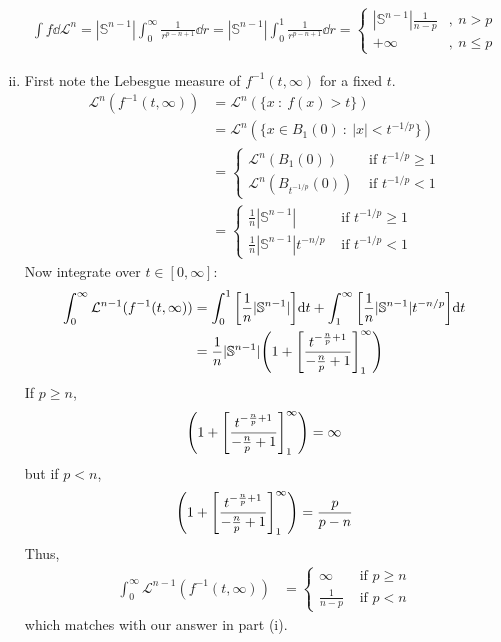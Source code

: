 \documentclass[12pt]{article}
\theoremstyle{plain}
\begin{document}
\begin{enumerate}[(i)]
        \begin{align*}
            \int f \dd \mathcal{L}^n = |\mathbb{S}^{n-1}|\int_0^\infty \frac{1}{r^{p-n+1}} \dd r = |\mathbb{S}^{n-1}|\int_0^1 \frac{1}{r^{p-n+1}} \dd r = \begin{cases}
                |\mathbb{S}^{n-1}|\frac{1}{n-p} &,\ n > p \\
                +\infty &,\ n \leq p
            \end{cases}
        \end{align*}
    \item
        First note the Lebesgue measure of $f^{-1}(t, \infty)$ for a fixed $t$.
        \begin{align*}
            \mathcal{L}^n(f^{-1}(t, \infty)) &= \mathcal{L}^n(\{x\ :\ f(x) > t\}) \\
            &= \mathcal{L}^n(\{x \in B_1(0)\ :\ |x| < t^{-1/p}\}) \\
            &= \begin{cases}
                \mathcal{L}^n(B_1(0)) & \text{ if } t^{-1/p} \geq 1 \\
                \mathcal{L}^n(B_{t^{-1/p}}(0)) & \text{ if } t^{-1/p} < 1
            \end{cases} \\
            &= \begin{cases}
                \frac{1}{n}|\mathbb{S}^{n-1}| & \text{ if } t^{-1/p} \geq 1 \\
                \frac{1}{n}|\mathbb{S}^{n-1}|t^{-n/p} & \text{ if } t^{-1/p} < 1
            \end{cases}
        \end{align*}
        Now integrate over $t \in [0, \infty]$:
        \begin{align*}
            \int_0^\infty \mathcal{L}^{n-1}(f^{-1}(t, \infty)) &= \int_0^1 \qty[\frac{1}{n}|\mathbb{S}^{n-1}|]\dd t + \int_1^\infty \qty[\frac{1}{n}|\mathbb{S}^{n-1}|t^{-n/p}]\dd t \\
            &= \frac{1}{n}|\mathbb{S}^{n-1}|\qty(1 + \qty[\frac{t^{-\frac{n}{p} + 1}}{-\frac{n}{p} + 1}]_1^\infty)
        \end{align*}
        If $p \geq n$,
        \begin{align*}
            \qty(1 + \qty[\frac{t^{-\frac{n}{p} + 1}}{-\frac{n}{p} + 1}]_1^\infty) = \infty
        \end{align*}
        but if $p < n$,
        \begin{align*}
            \qty(1 + \qty[\frac{t^{-\frac{n}{p} + 1}}{-\frac{n}{p} + 1}]_1^\infty) = \frac{p}{p-n}
        \end{align*}
        Thus,
        \begin{align*}
            \int_0^\infty \mathcal{L}^{n-1}(f^{-1}(t, \infty)) &= \begin{cases}
                \infty & \text{ if } p \geq n \\
                \frac{1}{n - p} & \text{ if } p < n
            \end{cases}
        \end{align*}
        which matches with our answer in part (i).
\end{enumerate}
\end{document}
